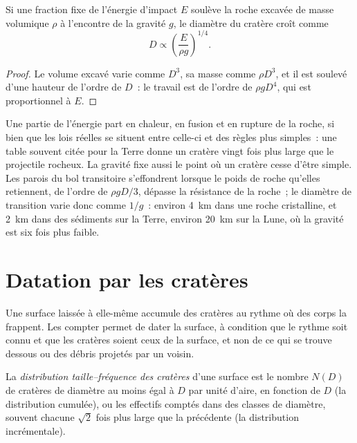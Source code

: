 \begin{proposition}\label{prop:b3:planetary-interiors-surfaces:scaling}
Si une fraction fixe de l'énergie d'impact $E$ soulève la roche excavée
de masse volumique $\rho$ à l'encontre de la gravité $g$, le diamètre du cratère croît comme
\[
  D \propto \left(\frac{E}{\rho g}\right)^{1/4} .
\]
\end{proposition}

\begin{proof}
Le volume excavé varie comme $D^3$, sa masse comme $\rho D^3$, et il est
soulevé d'une hauteur de l'ordre de $D$~: le travail est de l'ordre de $\rho g D^4$,
qui est proportionnel à $E$.
\end{proof}

Une partie de l'énergie part en chaleur, en fusion et en rupture de la roche, si bien
que les lois réelles se situent entre celle-ci et des règles plus simples~: une table
souvent citée pour la Terre donne un cratère vingt fois plus large que le projectile
rocheux. La gravité fixe aussi le point où un cratère cesse d'être simple. Les parois
du bol transitoire s'effondrent lorsque le poids de roche qu'elles retiennent,
de l'ordre de $\rho g D/3$, dépasse la résistance de la roche~; le diamètre de transition
varie donc comme $1/g$~: environ \qty{4}{km} dans une roche cristalline,
et \qty{2}{km} dans des sédiments sur la Terre, environ \qty{20}{km} sur la
Lune, où la gravité est six fois plus faible.

\section{Datation par les cratères}\label{sec:b3:planetary-interiors-surfaces:dating}

Une surface laissée à elle-même accumule des cratères au rythme où des corps la frappent.
Les compter permet de dater la surface, à condition que le rythme soit connu et que les
cratères soient ceux de la surface, et non de ce qui se trouve dessous ou des débris
projetés par un voisin.

\begin{definition}\label{def:b3:planetary-interiors-surfaces:sfd}
La \emph{distribution taille--fréquence des cratères}
d'une surface est le nombre $N(D)$ de cratères de diamètre au moins égal à $D$ par
unité d'aire, en fonction de $D$ (la distribution cumulée), ou les effectifs comptés
dans des classes de diamètre, souvent chacune $\sqrt2$ fois plus large que la précédente
(la distribution incrémentale).
\end{definition}


